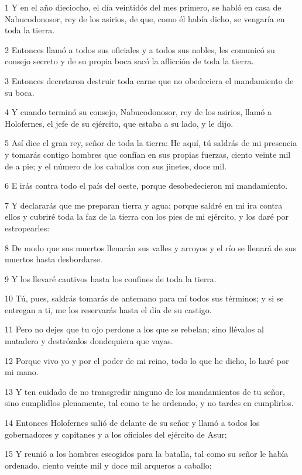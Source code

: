 \par 1 Y en el año dieciocho, el día veintidós del mes primero, se habló en casa de Nabucodonosor, rey de los asirios, de que, como él había dicho, se vengaría en toda la tierra.
\par 2 Entonces llamó a todos sus oficiales y a todos sus nobles, les comunicó su consejo secreto y de su propia boca sacó la aflicción de toda la tierra.
\par 3 Entonces decretaron destruir toda carne que no obedeciera el mandamiento de su boca.
\par 4 Y cuando terminó su consejo, Nabucodonosor, rey de los asirios, llamó a Holofernes, el jefe de su ejército, que estaba a su lado, y le dijo.
\par 5 Así dice el gran rey, señor de toda la tierra: He aquí, tú saldrás de mi presencia y tomarás contigo hombres que confían en sus propias fuerzas, ciento veinte mil de a pie; y el número de los caballos con sus jinetes, doce mil.
\par 6 E irás contra todo el país del oeste, porque desobedecieron mi mandamiento.
\par 7 Y declararás que me preparan tierra y agua; porque saldré en mi ira contra ellos y cubriré toda la faz de la tierra con los pies de mi ejército, y los daré por estropearles:
\par 8 De modo que sus muertos llenarán sus valles y arroyos y el río se llenará de sus muertos hasta desbordarse.
\par 9 Y los llevaré cautivos hasta los confines de toda la tierra.
\par 10 Tú, pues, saldrás tomarás de antemano para mí todos sus términos; y si se entregan a ti, me los reservarás hasta el día de su castigo.
\par 11 Pero no dejes que tu ojo perdone a los que se rebelan; sino llévalos al matadero y destrózalos dondequiera que vayas.
\par 12 Porque vivo yo y por el poder de mi reino, todo lo que he dicho, lo haré por mi mano.
\par 13 Y ten cuidado de no transgredir ninguno de los mandamientos de tu señor, sino cumplidlos plenamente, tal como te he ordenado, y no tardes en cumplirlos.
\par 14 Entonces Holofernes salió de delante de su señor y llamó a todos los gobernadores y capitanes y a los oficiales del ejército de Asur;
\par 15 Y reunió a los hombres escogidos para la batalla, tal como su señor le había ordenado, ciento veinte mil y doce mil arqueros a caballo;
